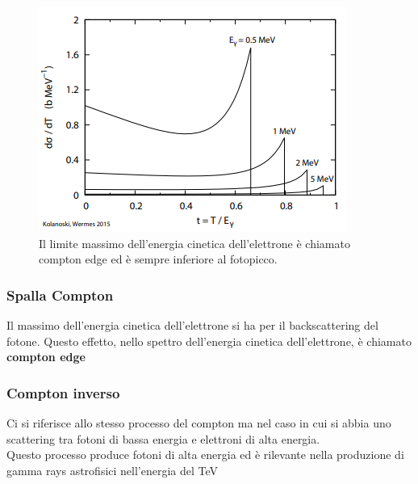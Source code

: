 \vspace{-10pt}
\hspace{-20pt}
\begin{minipage}{0.48\textwidth}
    \begin{figure}[H]
        \centering
        \includegraphics[width=\textwidth,frame]{Chapters/images/Interazione_radiazione_materia/image-20220220124719776.png}
        \captionsetup{width=\textwidth}
        \caption{Il limite massimo dell'energia cinetica dell'elettrone è chiamato compton edge ed è sempre inferiore al fotopicco.}
        \label{fig:comptonedge}
    \end{figure}
\end{minipage} \hfill
\begin{minipage}{0.48\textwidth}
    \vspace{5pt}
    \subsubsection*{Spalla Compton}
    \raggedright
    Il massimo dell'energia cinetica dell'elettrone si ha per il backscattering del fotone. Questo effetto, nello spettro dell'energia cinetica dell'elettrone, è chiamato \textbf{compton edge}
\vspace{-5pt}
\subsubsection*{Compton inverso}
Ci si riferisce allo stesso processo del compton ma nel caso in cui si abbia uno scattering tra fotoni di bassa energia e elettroni di alta energia.
\\
Questo processo produce fotoni di alta energia ed è rilevante nella produzione di gamma rays astrofisici nell'energia del TeV

\end{minipage}
